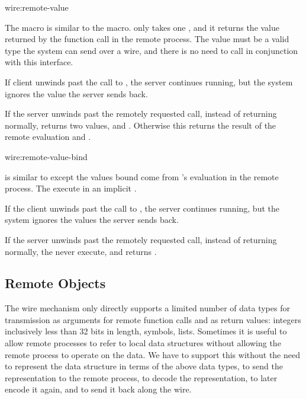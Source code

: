 \begin{defmac}{wire:}{remote-value}{}
  
  The  macro is similar to the  macro.
   only takes one , and it returns
  the value returned by the function call in the remote process.  The
  value must be a valid type the system can send over a wire, and
  there is no need to call  in conjunction
  with this interface.
  
  If client unwinds past the call to , the server
  continues running, but the system ignores the value the server sends
  back.
  
  If the server unwinds past the remotely requested call, instead of
  returning normally,  returns two values, \nil{}
  and \true.  Otherwise this returns the result of the remote
  evaluation and \nil.
\end{defmac}

\begin{defmac}{wire:}{remote-value-bind}{%
    }
  
   is similar to 
  except the values bound come from 's evaluation in
  the remote process.  The  execute in an implicit
  .
  
  If the client unwinds past the call to , the
  server continues running, but the system ignores the values the
  server sends back.
  
  If the server unwinds past the remotely requested call, instead of
  returning normally, the  never execute, and
   returns \nil.
\end{defmac}


\subsection{Remote Objects}
\label{remote-objs}

The wire mechanism only directly supports a limited number of data
types for transmission as arguments for remote function calls and as
return values: integers inclusively less than 32 bits in length,
symbols, lists.  Sometimes it is useful to allow remote processes to
refer to local data structures without allowing the remote process
to operate on the data.  We have  to support
this without the need to represent the data structure in terms of
the above data types, to send the representation to the remote
process, to decode the representation, to later encode it again, and
to send it back along the wire.

